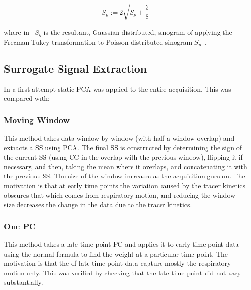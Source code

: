                 \begin{equation} \label{eq:pca_data_driven_surrogate_signal_extraction_methods_for_dynamic_pet_methods_freeman_tukey}
                    S_g := 2 \sqrt{S_p + \frac{3}{8}}
                \end{equation}

                \noindent where in~ $S_g$ is the resultant, Gaussian distributed, sinogram of applying the Freeman-Tukey transformation to Poisson distributed sinogram $S_p$~\cite{Freeman1950TransformationsRoot}.
            
            \subsection{Surrogate Signal Extraction} \label{sec:pca_data_driven_surrogate_signal_extraction_methods_for_dynamic_pet_methods_surrogate_signal_extraction}
                In a first attempt static \gls{PCA} was applied to the entire acquisition. This was compared with:
                
                \subsubsection{Moving Window} \label{sec:pca_data_driven_surrogate_signal_extraction_methods_for_dynamic_pet_methods_moving_window}
                    This method takes data window by window (with half a window overlap) and extracts a \gls{SS} using \gls{PCA}. The final \gls{SS} is constructed by determining the sign of the current \gls{SS} (using \gls{CC} in the overlap with the previous window), flipping it if necessary, and then, taking the mean where it overlaps, and concatenating it with the previous \gls{SS}. The size of the window increases as the acquisition goes on. The motivation is that at early time points the variation caused by the tracer kinetics obscures that which comes from respiratory motion, and reducing the window size decreases the change in the data due to the tracer kinetics.
                
                \subsubsection{One \gls{PC}} \label{sec:pca_data_driven_surrogate_signal_extraction_methods_for_dynamic_pet_methods_one_pc}
                    This method takes a late time point \gls{PC} and applies it to early time point data using the normal formula to find the weight at a particular time point. The motivation is that the  of late time point data capture mostly the respiratory motion only. This was verified by checking that the late time point  did not vary substantially.
            
